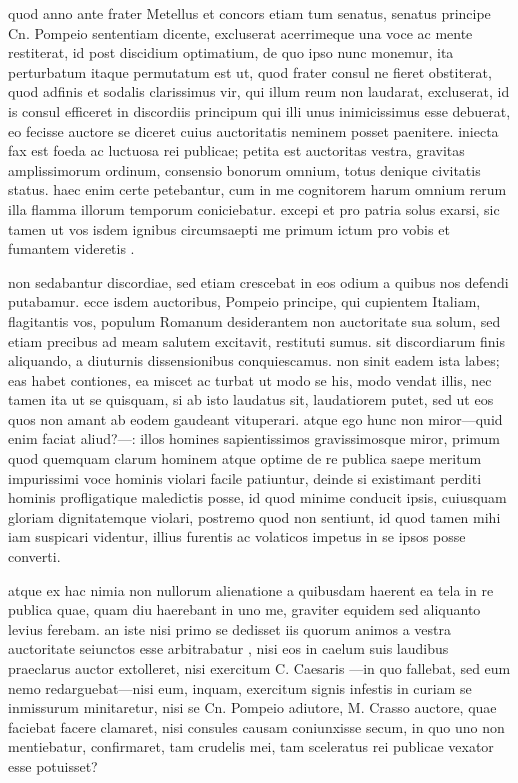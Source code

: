  quod anno ante frater Metellus et concors etiam tum senatus, senatus principe Cn. Pompeio sententiam dicente, excluserat acerrimeque una voce ac mente restiterat, id post discidium optimatium, de quo ipso nunc monemur, ita perturbatum itaque permutatum est ut, quod frater consul ne fieret obstiterat, quod adfinis et sodalis clarissimus vir, qui illum reum non laudarat, excluserat, id is consul efficeret in discordiis principum qui illi unus inimicissimus esse debuerat, eo fecisse auctore se diceret cuius auctoritatis neminem posset paenitere. iniecta fax est foeda ac luctuosa rei publicae; petita est auctoritas vestra, gravitas amplissimorum ordinum, consensio bonorum omnium, totus denique civitatis status. haec enim certe petebantur, cum in me cognitorem harum omnium rerum illa flamma illorum temporum coniciebatur. excepi et pro patria solus exarsi, sic tamen ut vos isdem ignibus circumsaepti me primum ictum pro vobis et fumantem videretis .

 non sedabantur discordiae, sed etiam crescebat in eos odium a quibus nos defendi putabamur. ecce isdem auctoribus, Pompeio principe, qui cupientem Italiam, flagitantis vos, populum Romanum desiderantem non auctoritate sua solum, sed etiam precibus ad meam salutem excitavit, restituti sumus. sit discordiarum finis aliquando, a diuturnis dissensionibus conquiescamus. non sinit eadem ista labes; eas habet contiones, ea miscet ac turbat ut modo se his, modo vendat illis, nec tamen ita ut se quisquam, si ab isto laudatus sit, laudatiorem putet, sed ut eos quos non amant ab eodem gaudeant vituperari. atque ego hunc non miror—quid enim faciat aliud?—: illos homines sapientissimos gravissimosque miror, primum quod quemquam clarum hominem atque optime de re publica saepe meritum impurissimi voce hominis violari facile patiuntur, deinde si existimant perditi hominis profligatique maledictis posse, id quod minime conducit ipsis, cuiusquam gloriam dignitatemque violari, postremo quod non sentiunt, id quod tamen mihi iam suspicari videntur, illius furentis ac volaticos impetus in se ipsos posse converti.

 atque ex hac nimia non nullorum alienatione a quibusdam haerent ea tela in re publica quae, quam diu haerebant in uno me, graviter equidem sed aliquanto levius ferebam. an iste nisi primo se dedisset iis quorum animos a vestra auctoritate seiunctos esse arbitrabatur , nisi eos in caelum suis laudibus praeclarus auctor extolleret, nisi exercitum C. Caesaris —in quo fallebat, sed eum nemo redarguebat—nisi eum, inquam, exercitum signis infestis in curiam se inmissurum minitaretur, nisi se Cn. Pompeio adiutore, M. Crasso auctore, quae faciebat facere clamaret, nisi consules causam coniunxisse secum, in quo uno non mentiebatur, confirmaret, tam crudelis mei, tam sceleratus rei publicae vexator esse potuisset?


